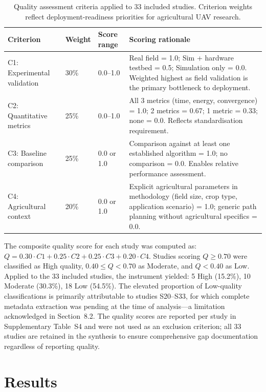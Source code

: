 \documentclass[review,3p,times]{elsarticle}
\begin{document}
\begin{table}[htbp]
\centering
\caption{Quality assessment criteria applied to 33 included studies. Criterion weights reflect deployment-readiness priorities for agricultural UAV research.}
\label{tab:quality_criteria}
\begin{tabularx}{\textwidth}{lllX}
\toprule
\textbf{Criterion} & \textbf{Weight} & \textbf{Score range} & \textbf{Scoring rationale} \\
\midrule
C1: Experimental validation & 30\% & 0.0--1.0 & Real field = 1.0; Sim + hardware testbed = 0.5; Simulation only = 0.0. Weighted highest as field validation is the primary bottleneck to deployment. \\
C2: Quantitative metrics & 25\% & 0.0--1.0 & All 3 metrics (time, energy, convergence) = 1.0; 2 metrics = 0.67; 1 metric = 0.33; none = 0.0. Reflects standardisation requirement. \\
C3: Baseline comparison & 25\% & 0.0 or 1.0 & Comparison against at least one established algorithm = 1.0; no comparison = 0.0. Enables relative performance assessment. \\
C4: Agricultural context & 20\% & 0.0 or 1.0 & Explicit agricultural parameters in methodology (field size, crop type, application scenario) = 1.0; generic path planning without agricultural specifics = 0.0. \\
\bottomrule
\end{tabularx}
\end{table}

The composite quality score for each study was computed as: $Q = 0.30 \cdot C1 + 0.25 \cdot C2 + 0.25 \cdot C3 + 0.20 \cdot C4$. Studies scoring $Q \geq 0.70$ were classified as High quality, $0.40 \leq Q < 0.70$ as Moderate, and $Q < 0.40$ as Low. Applied to the 33 included studies, the instrument yielded: 5 High (15.2\%), 10 Moderate (30.3\%), 18 Low (54.5\%). The elevated proportion of Low-quality classifications is primarily attributable to studies S20--S33, for which complete metadata extraction was pending at the time of analysis---a limitation acknowledged in Section~8.2. The quality scores are reported per study in Supplementary Table~S4 and were not used as an exclusion criterion; all 33 studies are retained in the synthesis to ensure comprehensive gap documentation regardless of reporting quality.

\section{Results}
\end{document}
